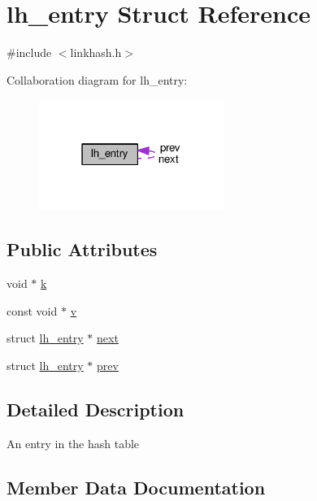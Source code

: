 \hypertarget{structlh__entry}{}\section{lh\+\_\+entry Struct Reference}
\label{structlh__entry}


{\ttfamily \#include $<$linkhash.\+h$>$}



Collaboration diagram for lh\+\_\+entry\+:
\nopagebreak
\begin{figure}[H]
\begin{center}
\leavevmode
\includegraphics[width=171pt]{structlh__entry__coll__graph}
\end{center}
\end{figure}
\subsection*{Public Attributes}
\begin{DoxyCompactItemize}
\item 
void $\ast$ \hyperlink{structlh__entry_a6b176b3582c9cf553af6431750f5c3b6}{k}
\item 
const void $\ast$ \hyperlink{structlh__entry_a1b676732ab2ad3eeaedf6ec60a6a0835}{v}
\item 
struct \hyperlink{structlh__entry}{lh\+\_\+entry} $\ast$ \hyperlink{structlh__entry_a7c40c46e72d9a0ba071a8d49d535bc67}{next}
\item 
struct \hyperlink{structlh__entry}{lh\+\_\+entry} $\ast$ \hyperlink{structlh__entry_a6fb9c3de01fb5af67d8d429921cc6a3b}{prev}
\end{DoxyCompactItemize}


\subsection{Detailed Description}
An entry in the hash table 

\subsection{Member Data Documentation}

